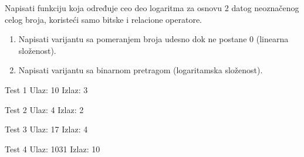 \begin{Exercise}[label=408]
  Napisati funkciju koja određuje ceo deo logaritma za osnovu 2 datog
  neoznačenog celog broja, koristeći samo bitske i relacione
  operatore.
  \begin{enumerate}
  \item Napisati varijantu sa pomeranjem broja udesno dok ne postane 0
    (linearna složenost).
  \item Napisati varijantu sa binarnom pretragom (logaritamska složenost).
  \end{enumerate}
  
\begin{minitest}
\begin{test}{Test 1}
Ulaz:       10
Izlaz:      3
\end{test}
\end{minitest}
\begin{minitest}
\begin{test}{Test 2}
Ulaz:       4
Izlaz:      2
\end{test}
\end{minitest}
\begin{minitest}
\begin{test}{Test 3}
Ulaz:       17
Izlaz:      4
\end{test}
\end{minitest}

\begin{minitest}
\begin{test}{Test 4}
Ulaz:       1031
Izlaz:      10
\end{test}
\end{minitest}
  
\end{Exercise}

